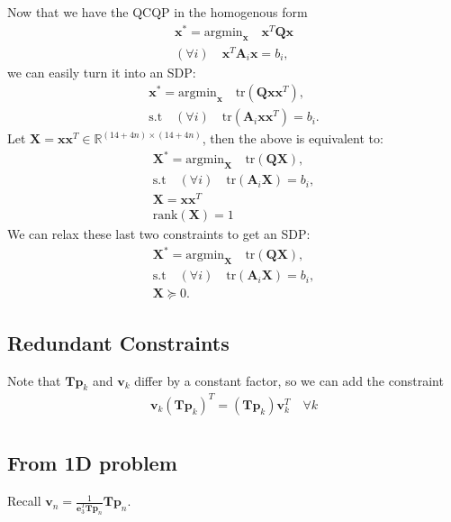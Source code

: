 \documentclass{article}
\newcommand{\mbf}[1]{\mathbf{#1}}
\begin{document}
Now that we have the QCQP in the homogenous form
\begin{align}
\mbf{x}^* = \text{argmin}_{\mbf{x}} \quad \mbf{x}^T \mbf{Q} \mbf{x}\\
(\forall i) \quad \mbf{x}^T \mbf{A}_i \mbf{x} = b_i,
\end{align}
we can easily turn it into an SDP:
\begin{align}
\mbf{x}^* = \text{argmin}_{\mbf{x}} \quad \text{tr}(\mbf{Q}\mbf{x}\mbf{x}^T),\\
\text{s.t}\quad (\forall i) \quad \text{tr}(\mbf{A}_i \mbf{x} \mbf{x}^T) = b_i.
\end{align}
Let $\mbf{X} = \mbf{x}\mbf{x}^T \in \mathbb{R}^{(14 + 4n) \times (14 + 4n)}$, then the above is equivalent to:
\begin{align}
\mbf{X}^* = \text{argmin}_{\mbf{X}} \quad \text{tr}(\mbf{Q}\mbf{X}),\\
\text{s.t}\quad (\forall i) \quad \text{tr}(\mbf{A}_i \mbf{X}) = b_i,\\
\mbf{X} = \mbf{x} \mbf{x}^T\\
\text{rank}(\mbf{X}) = 1
\end{align}
We can relax these last two constraints to get an SDP:
\begin{align}
\mbf{X}^* = \text{argmin}_{\mbf{X}} \quad \text{tr}(\mbf{Q}\mbf{X}),\\
\text{s.t}\quad (\forall i) \quad \text{tr}(\mbf{A}_i \mbf{X}) = b_i,\\
\mbf{X} \succeq 0.
\end{align}

\subsection{Redundant Constraints}

Note that $\mbf{T}\mbf{p}_k$ and $\mbf{v}_k$ differ by a constant factor, so we can add
the constraint
\begin{align}
\mbf{v}_k (\mbf{T} \mbf{p}_k)^T = (\mbf{T} \mbf{p}_k) \mbf{v}_k^T \quad \forall k \\
\end{align}

\subsection{From 1D problem}

Recall $\mbf{v}_n = \frac{1}{\mbf{e}_3^T \mbf{T} \mbf{p}_n} \mbf{T} \mbf{p}_n$.
\end{document}
